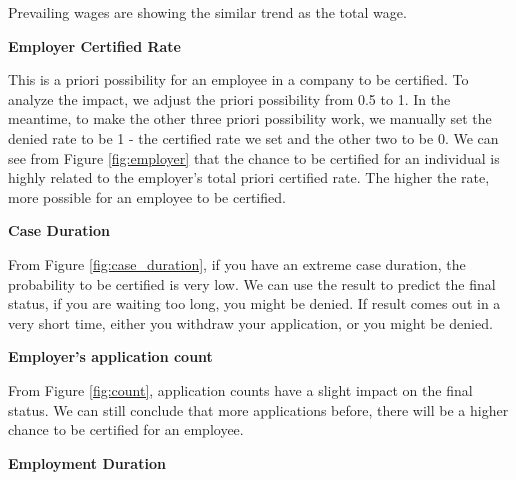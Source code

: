 \documentclass{article}
\begin{document}
Prevailing wages are showing the similar trend as the total wage. 

\noindent\textbf{Employer Certified Rate}

This is a priori possibility for an employee in a company to be certified. To analyze the impact, we adjust the priori possibility from 0.5 to 1. In the meantime, to make the other three priori possibility work, we manually set the denied rate to be 1 - the certified rate we set and the other two to be 0. We can see from Figure \ref{fig:employer} that the chance to be certified for an individual is highly related to the employer’s total priori certified rate. The higher the rate, more possible for an employee to be certified. 

\noindent\textbf{Case Duration}

From Figure \ref{fig:case_duration}, if you have an extreme case duration, the probability to be certified is very low. We can use the result to predict the final status, if you are waiting too long, you might be denied. If result comes out in a very short time, either you withdraw your application, or you might be denied. 

\noindent\textbf{Employer’s application count}

From Figure \ref{fig:count}, application counts have a slight impact on the final status. We can still conclude that more applications before, there will be a higher chance to be certified for an employee. 

\noindent\textbf{Employment Duration}
\end{document}
